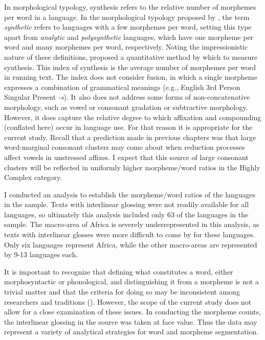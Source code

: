   In morphological typology, synthesis refers to the relative number of morphemes per word in a language. In the morphological typology proposed by \citet{Sapir1921}, the term \textit{synthetic} refers to languages with a few morphemes per word, setting this type apart from \textit{analytic} and \textit{polysynthetic} languages, which have one morpheme per word and many morphemes per word, respectively. Noting the impressionistic nature of these definitions, \citet{Greenberg1954} proposed a quantitative method by which to measure synthesis. This index of synthesis is the average number of morphemes per word in running text. The index does not consider fusion, in which a single morpheme expresses a combination of grammatical meanings (e.g., English 3rd Person Singular Present \textit{-s}). It also does not address some forms of non-concatenative morphology, such as vowel or consonant gradation or subtractive morphology. However, it does capture the relative degree to which affixation and compounding (conflated here) occur in language use. For that reason it is appropriate for the current study. Recall that a prediction made in previous chapters was that large word-marginal consonant clusters may come about when reduction processes affect vowels in unstressed affixes. I expect that this source of large consonant clusters will be reflected in uniformly higher morpheme/word ratios in the Highly Complex category.

  I conducted an analysis to establish the morpheme/word ratios of the languages in the sample. Texts with interlinear glossing were not readily available for all languages, so ultimately this analysis included only 63 of the languages in the sample. The macro-area of Africa is severely underrepresented in this analysis, as texts with interlinear glosses were more difficult to come by for these languages. Only six languages represent Africa, while the other macro-areas are represented by 9-13 languages each.

  It is important to recognize that defining what constitutes a word, either morphosyntactic or phonological, and distinguishing it from a morpheme is not a trivial matter and that the criteria for doing so may be inconsistent among researchers and traditions (\citealt{Haspelmath2011,SchieringEtAl2010}). However, the scope of the current study does not allow for a close examination of these issues. In conducting the morpheme counts, the interlinear glossing in the source was taken at face value. Thus the data may represent a variety of analytical strategies for word and morpheme segmentation. 

